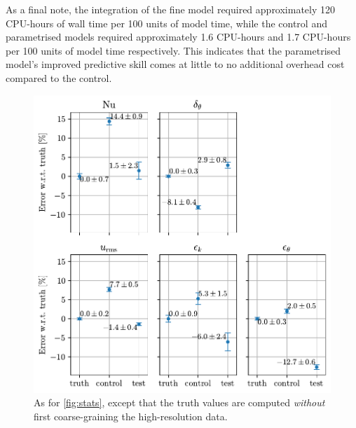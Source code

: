 \documentclass[../main.tex]{subfiles}
\begin{document}
As a final note, the integration of the fine model required approximately
120 CPU-hours of wall time per 100 units of model time, while the control and
parametrised models required approximately 1.6 CPU-hours and 1.7 CPU-hours
per 100 units of model time respectively. This indicates that the parametrised
model's improved predictive skill comes at little to no additional overhead
cost compared to the control.


\begin{figure}[ht]
    \centering
    \includegraphics[width=0.6\linewidth]{figures/stats_vs_fine.pdf}
    \caption{
        As for \cref{fig:stats}, except that the truth values are computed
        \emph{without} first coarse-graining the high-resolution data.
    }
    \label{fig:stats_vs_fine}
\end{figure}

\ifSubfilesClassLoaded{%
    \emergencystretch=5em
    \printbibliography{}
}{}
\end{document}
